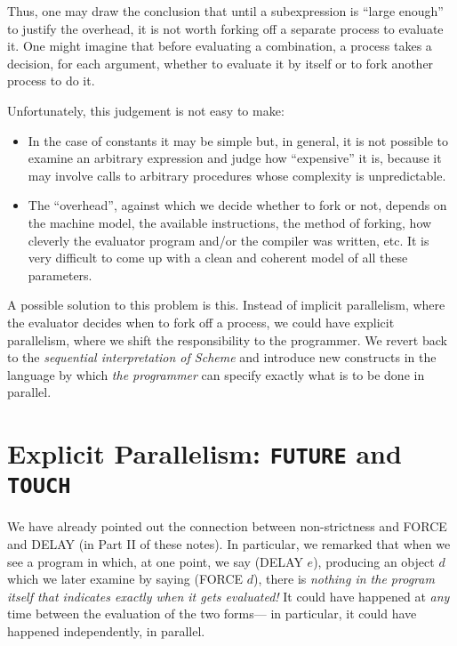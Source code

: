 Thus, one may draw the conclusion that until a subexpression is ``large
enough'' to justify the overhead, it is not worth forking off a separate
process to evaluate it.  One might imagine that before evaluating a
combination, a process takes a decision, for each argument, whether to
evaluate it by itself or to fork another process to do it.

Unfortunately, this judgement is not easy to make:
\begin{itemize}

\item In the case of constants it may be simple but, in general, it is not
possible to examine an arbitrary expression and judge how ``expensive'' it
is, because it may involve calls to arbitrary procedures whose complexity is
unpredictable.

\item The ``overhead'', against which we decide whether to fork or not,
depends on the machine model, the available instructions, the method of
forking, how cleverly the evaluator program and/or the compiler was written,
etc.  It is very difficult to come up with a clean and coherent model of all
these parameters.

\end{itemize}

A possible solution to this problem is this.  Instead of implicit
parallelism, where the evaluator decides when to fork off a process, we
could have explicit parallelism, where we shift the responsibility to the
programmer.  We revert back to the {\em sequential interpretation of
Scheme\/} and introduce new constructs in the language by which {\em the
programmer\/} can specify exactly what is to be done in parallel.

\section{Explicit Parallelism: {\tt FUTURE} and {\tt TOUCH}}

We have already pointed out the connection between non-strictness and {\cf
FORCE} and {\cf DELAY} (in Part II of these notes).  In particular, we
remarked that when we see a program in which, at one point, we say {\cf
(DELAY $e$)}, producing an object $d$ which we later examine by saying {\cf
(FORCE $d$)}, there is {\em nothing in the program itself that indicates
exactly when it gets evaluated!\/} It could have happened at {\em any\/} time
between the evaluation of the two forms--- in particular, it could have
happened independently, in parallel.

